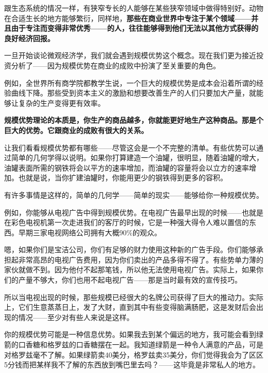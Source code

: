 跟生态系统的情况一样，有狭窄专长的人能够在某些狭窄领域中做得特别好。动物在合适生长的地方能够繁衍，同样地，\textbf{那些在商业世界中专注于某个领域——并且由于专注而变得非常优秀——的人，往往能够得到他们无法以其他方式获得的良好经济回报。}
\par

一旦开始谈论微观经济学，我们就会遇到规模优势这个概念。现在我们更为接近投资分析了——因为规模优势在商业的成败中扮演了至关重要的角色。
\par

例如，全世界所有商学院都教学生说，一个巨大的规模优势是成本会沿着所谓的经验曲线下降。那些受到资本主义的激励和想要改善生产的人们只要加大产量，就能够让复杂的生产变得更有效率。
\par

\textbf{规模优势理论的本质是，你生产的商品越多，你就能更好地生产这种商品。那是个巨大的优势。它跟商业的成败有很大的关系。}
\par

让我们看看规模优势都有哪些——尽管这会是一个不完整的清单。有些优势可以通过简单的几何学得以说明。如果你打算建造一个油罐，很明显，随着油罐的增大，油罐表面所需的钢铁将会以平方的速率增加，而油罐的容量将会以立方的速率增加。也就是说，当你扩建油罐时，你能用更少的钢铁得到更多的容积。
\par

有许多事情是这样的，简单的几何学——简单的现实——能够给你一种规模优势。
\par

例如，你能够从电视广告中得到规模优势。在电视广告最早出现的时候——也就是在彩色电视机第一次走进我们的客厅的时候，它是一种强大得令人难以置信的东西。早期三家电视网络公司拥有大概90\%的观众。
\par

嗯，如果你们是宝洁公司，你们有足够的财力使用这种新的广告手段。你们能够承担起非常高昂的电视广告费用，因为你们卖出的产品多得不得了。有些势单力薄的家伙就做不到。因为他付不起那笔钱，所以他无法使用电视广告。实际上，如果你们的产量不够大，你们也用不起电视广告——那是当时最有效的宣传技巧。
\par

所以当电视出现的时候，那些规模已经很大的名牌公司获得了巨大的推动力。实际上，它们生意蒸蒸日上，发了大财，直到其中有些变得脑满肠肥，这是发财后会出现的情况——至少对有些人来说是这样。
\par

你的规模优势可能是一种信息优势。如果我去到某个偏远的地方，我可能会看到绿箭的口香糖和格罗兹的口香糖摆在一起。我知道绿箭是一种令人满意的产品，可是对格罗兹毫不了解。如果绿箭卖40美分，格罗兹卖35美分，你们觉得我会为了区区5分钱而把某样我不了解的东西放到嘴巴里去吗？——这毕竟是非常私人的地方。
\par

